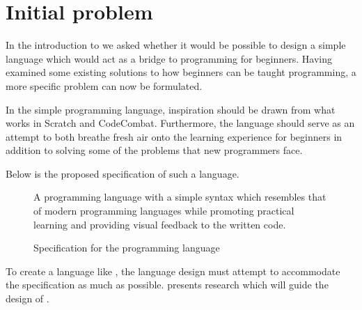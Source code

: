 \section{Initial problem}\label{sec:initial_problem}
In the introduction to  we asked whether it would be possible to design a simple language which would act as a bridge to programming for beginners.
Having examined some existing solutions to how beginners can be taught programming, a more specific problem can now be formulated.

In the simple programming language, inspiration should be drawn from what works in Scratch and CodeCombat. Furthermore, the language should serve as an attempt to both breathe fresh air onto the learning experience for beginners in addition to solving some of the problems that new programmers face.

Below is the proposed specification of such a language.

\begin{figure}[h]
    \vspace{0.5cm}
    \centering
    \begin{framed}
        A programming language with a simple syntax which resembles that of modern programming languages while promoting practical learning and providing visual feedback to the written code.
    \end{framed}
    \vspace{-0.5cm}
    \caption{Specification for the \dazel{} programming language}
    \label{fig:dazel_specification}
    \vspace{0.5cm}
\end{figure}

To create a language like \dazel{}, the language design must attempt to accommodate the specification as much as possible.  presents research which will guide the design of \dazel{}.